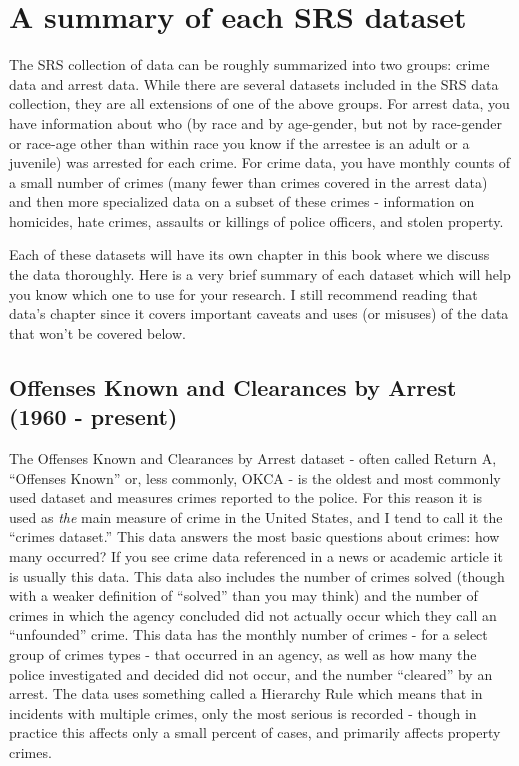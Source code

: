 \documentclass[
]{krantz}
\begin{document}
\section{A summary of each SRS
dataset}\label{a-summary-of-each-srs-dataset}

The SRS collection of data can be roughly summarized into
two groups: crime data and arrest data. While there are
several datasets included in the SRS data collection, they
are all extensions of one of the above groups. For arrest
data, you have information about who (by race and by
age-gender, but not by race-gender or race-age other than
within race you know if the arrestee is an adult or a
juvenile) was arrested for each crime. For crime data, you
have monthly counts of a small number of crimes (many fewer
than crimes covered in the arrest data) and then more
specialized data on a subset of these crimes - information
on homicides, hate crimes, assaults or killings of police
officers, and stolen property.

Each of these datasets will have its own chapter in this
book where we discuss the data thoroughly. Here is a very
brief summary of each dataset which will help you know which
one to use for your research. I still recommend reading that
data's chapter since it covers important caveats and uses
(or misuses) of the data that won't be covered below.

\subsection{Offenses Known and Clearances by Arrest (1960 -
present)}\label{offenses-known-and-clearances-by-arrest-1960---present}

The Offenses Known and Clearances by Arrest dataset - often
called Return A, ``Offenses Known'' or, less commonly, OKCA
- is the oldest and most commonly used dataset and measures
crimes reported to the police. For this reason it is used as
\emph{the} main measure of crime in the United States, and I
tend to call it the ``crimes dataset.'' This data answers
the most basic questions about crimes: how many occurred? If
you see crime data referenced in a news or academic article
it is usually this data. This data also includes the number
of crimes solved (though with a weaker definition of
``solved'' than you may think) and the number of crimes in
which the agency concluded did not actually occur which they
call an ``unfounded'' crime. This data has the monthly
number of crimes - for a select group of crimes types - that
occurred in an agency, as well as how many the police
investigated and decided did not occur, and the number
``cleared'' by an arrest. The data uses something called a
Hierarchy Rule which means that in incidents with multiple
crimes, only the most serious is recorded - though in
practice this affects only a small percent of cases, and
primarily affects property crimes.
\end{document}
